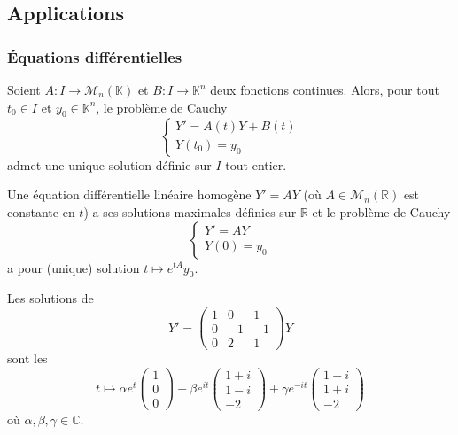   \subsection{Applications}

  \subsubsection{Équations différentielles}


  \begin{theorem}
    Soient $A : I \rightarrow \mathcal{M}_n(\mathbb{K})$ et $B : I \rightarrow \mathbb{K}^n$ deux fonctions continues. Alors, pour tout $t_0 \in I$ et $y_0 \in \mathbb{K}^n$, le problème de Cauchy
    \[ \begin{cases} Y' = A(t)Y + B(t) \\ Y(t_0) = y_0 \end{cases} \]
    admet une unique solution définie sur $I$ tout entier.
  \end{theorem}

  \begin{proposition}
    Une équation différentielle linéaire homogène $Y' = AY$ (où $A \in \mathcal{M}_n(\mathbb{R})$ est constante en $t$) a ses solutions maximales définies sur $\mathbb{R}$ et le problème de Cauchy
    \[ \begin{cases} Y' = AY \\ Y(0) = y_0 \end{cases} \]
    a pour (unique) solution $t \mapsto e^{tA} y_0$.
  \end{proposition}

  \begin{example}
    Les solutions de
    \[ Y' = \begin{pmatrix} 1 & 0 & 1 \\ 0 & -1 & -1 \\ 0 & 2 & 1 \end{pmatrix} Y \]
    sont les
    \[ t \mapsto \alpha e^t \begin{pmatrix} 1 \\ 0 \\ 0 \end{pmatrix} + \beta e^{it} \begin{pmatrix} 1+i \\ 1-i \\ -2 \end{pmatrix} + \gamma e^{-it} \begin{pmatrix} 1-i \\ 1+i \\ -2 \end{pmatrix} \]
    où $\alpha, \beta, \gamma \in \mathbb{C}$.
  \end{example}

